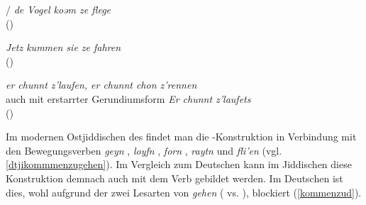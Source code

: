 {\item {}/{} \textit{de Vogel koəm ze flege}\\
(\citealt[Bd. 9, Sp. 836]{RheinischesWB})\label{kommenrhein}

\item  {}  \textit{Jetz kummen sie ze fahren} \\
(\citealt[Bd. 2, Sp.888a]{WBderelsaessischenMA})\label{kommenelsass}

\item {\hochaleman} \textit{er chunnt z’laufen, er chunnt chon z’rennen}\\
auch mit erstarrter Gerundiumsform \textit{Er chunnt z’laufets} \\
(\citealt[Bd. 3, Sp. 263]{WBschweizeridiotikon})\label{kommenschweiz}

}
  


Im modernen Ostjiddischen des  findet man die -Konstruktion in Verbindung mit den Bewegungsverben \textit{geyn} , \textit{loyfn} , \textit{forn} ,  \textit{raytn}  und \textit{fli'en}  (vgl.\, \ref{dtjikommmenzugehen}). Im Vergleich zum Deutschen kann im Jiddischen diese Konstruktion demnach auch mit dem Verb  gebildet werden. Im Deutschen ist dies, wohl aufgrund der zwei Lesarten von \textit{gehen} ( vs. ), blockiert (\ref{kommenzud}).  



